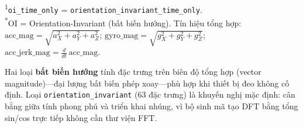 \begin{table}[ht]
\centering
\caption{Sáu loại trích xuất đặc trưng: tín hiệu nguồn, cấu thành và đặc tính triển khai}
\label{tab:feature_modes}
\small
{}
\vspace{4pt}
\begin{minipage}{\linewidth}
\footnotesize
\textsuperscript{1}\texttt{oi\_time\_only} = \texttt{orientation\_invariant\_time\_only}.\\
\textsuperscript{*}OI = Orientation-Invariant (bất biến hướng).
Tín hiệu tổng hợp: $\text{acc\_mag} = \sqrt{a_X^2+a_Y^2+a_Z^2}$;
$\text{gyro\_mag} = \sqrt{g_X^2+g_Y^2+g_Z^2}$;
$\text{acc\_jerk\_mag} = \tfrac{d}{dt}\,\text{acc\_mag}$.
\end{minipage}
\end{table}

Hai loại \textbf{bất biến hướng} tính đặc trưng trên biên độ tổng hợp (vector magnitude)---đại lượng bất biến phép xoay---phù hợp khi thiết bị đeo không cố định. Loại \texttt{orientation\_invariant} (63 đặc trưng) là khuyến nghị mặc định: cân bằng giữa tính phong phú và triển khai nhúng, vì bộ sinh mã tạo DFT bằng tổng sin/cos trực tiếp không cần thư viện FFT.

